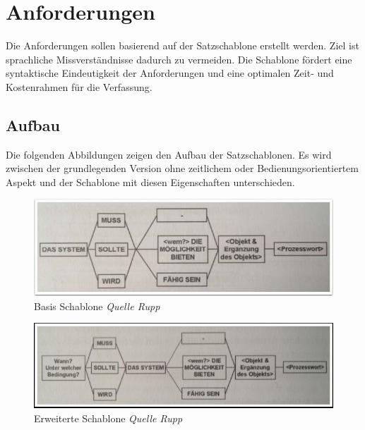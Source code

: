 \newpage

\section{Anforderungen}\label{anforderungen-1}

Die Anforderungen sollen basierend auf der Satzschablone erstellt
werden. Ziel ist sprachliche Missverständnisse dadurch zu vermeiden. Die
Schablone fördert eine syntaktische Eindeutigkeit der Anforderungen und
eine optimalen Zeit- und Kostenrahmen für die Verfassung.

\subsection{Aufbau}\label{aufbau}

Die folgenden Abbildungen zeigen den Aufbau der Satzschablonen. Es wird
zwischen der grundlegenden Version ohne zeitlichem oder
Bedienungsorientiertem Aspekt und der Schablone mit diesen Eigenschaften
unterschieden.

\begin{figure}[htbp]
\centering
\includegraphics{images/basis-schablone.jpg}
\caption[Basis Schablone \emph{Quelle Rupp}]{Basis Schablone
\emph{Quelle Rupp}\footnotemark{}}
\end{figure}

\begin{figure}[htbp]
\centering
\includegraphics{images/erweiterte-schablone.jpg}
\caption[Erweiterte Schablone \emph{Quelle Rupp}]{Erweiterte Schablone
\emph{Quelle Rupp}\footnotemark{}}
\end{figure}

